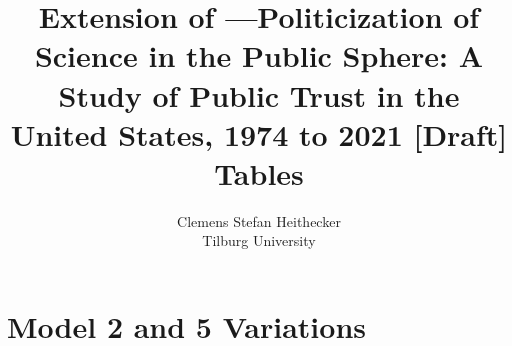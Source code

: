 \documentclass[12pt, a4paper, titlepage]{article}
\title{Extension of \citet{gauchat-2012}---Politicization of Science in the Public Sphere: A Study of Public Trust in the United States, 1974 to 2021 [Draft] \\[0.2em] \Large Tables}
\author{Clemens Stefan Heithecker \\ Tilburg University}
\begin{document}
\nocite{davern-2021}
\nocite{gauchat-2012}


\maketitle



\clearpage


\clearpage


\clearpage


\clearpage



\section{Model 2 and 5 Variations}



\clearpage


\clearpage
\printbibliography
\end{document}
